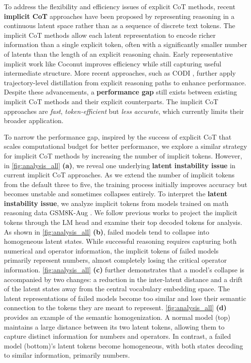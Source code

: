 To address the flexibility and efficiency issues of explicit CoT methods, recent \textbf{implicit CoT} approaches \citep{hao2024coconut, zhang2025soft, li2025implicit} have been proposed by representing reasoning in a continuous latent space rather than as a sequence of discrete text tokens.
The implicit CoT methods allow each latent representation to encode richer information than a single explicit token, often with a significantly smaller number of latents than the length of an explicit reasoning chain.
Early representative implicit work like Coconut \citep{hao2024coconut} improves efficiency while still capturing useful intermediate structure.
More recent approaches, such as CODI \citep{shen2025codi}, further apply trajectory-level distillation from explicit reasoning paths to enhance performance.
Despite these advancements, a \textbf{performance gap} still exists between existing implicit CoT methods and their explicit counterparts. The implicit CoT approaches are \textit{fast}, \textit{token-efficient} but \textit{less accurate}, which currently limits their broader application.

To narrow the performance gap, inspired by the success of explicit CoT that scales computational budget for better performance, we explore a similar strategy for implicit CoT methods by increasing the number of implicit tokens.
However, in \cref{fig:analysis_all} \textbf{(a)}, we reveal one underlying \textbf{latent instability issue} in current implicit CoT approaches.
As we extend the number of implicit tokens from the default three \citep{hao2024coconut} to five, the training process initially improves accuracy but becomes unstable and sometimes collapses entirely.
To interpret the \textbf{latent instability issue}, we analyze implicit tokens from models trained on math reasoning data GSM8K-Aug \citep{icot}.
We follow previous works \citep{hao2024coconut,icot} to project the implicit tokens through the LM head and examine their top decoded tokens for analysis.
As shown in \cref{fig:analysis_all} \textbf{(b)}, failed models tend to collapse into homogeneous latent states.
While successful reasoning requires capturing both numerical and operator information, the implicit tokens of failed models primarily represent numbers, almost completely losing the critical operator information.
\cref{fig:analysis_all} \textbf{(c)} further demonstrates that a model's collapse is accompanied by two changes: a reduction in the inter-latent distance and a drift of the latent states away from the central vocabulary embedding space.
The latent representations of failed models become too similar and lose their semantic connection to the tokens they are meant to represent.
\cref{fig:analysis_all} \textbf{(d)} provides an example of the semantic homogenization.
A normal model (top) maintains a large distance between its two latent tokens, allowing them to capture distinct information for numbers and operators.
In contrast, a failed model (bottom)'s latent tokens become homogeneous, with both states decoding to similar information, primarily numbers.

